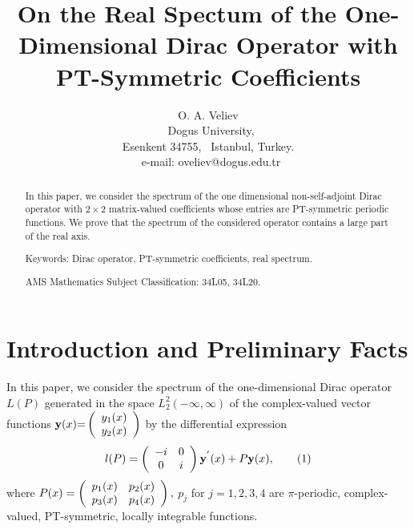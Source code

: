 \documentclass{article}%
\begin{document}
\title{On the Real Spectum of the One-Dimensional Dirac Operator with PT-Symmetric Coefficients}
\author{O. A. Veliev\\{\small \ Dogus University, }\\{\small Esenkent 34755, \ Istanbul, Turkey.}\\\ {\small e-mail: oveliev@dogus.edu.tr}}
\date{}
\maketitle

\begin{abstract}
In this paper, we consider the spectrum of the one dimensional
non-self-adjoint Dirac operator with $2\times2$ matrix-valued coefficients
whose entries are PT-symmetric periodic functions. We prove that the spectrum
of the considered operator contains a large part of the real axis.

Keywords: Dirac operator, PT-symmetric coefficients, real spectrum.

AMS Mathematics Subject Classification: 34L05, 34L20.

\end{abstract}

\section{ Introduction and Preliminary Facts}

In this paper, we consider the spectrum of the one-dimensional Dirac operator
$L(P)$ generated in the space $L_{2}^{2}(-\infty,\infty)$ of the
complex-valued vector functions $\mathbf{y}(x)\mathbf{=}\left(
\begin{array}
[c]{c}%
y_{1}(x)\\
y_{2}(x)
\end{array}
\right)  $ by the differential expression
\begin{equation}
l(P)=\left(
\begin{array}
[c]{cc}%
-i & 0\\
0 & i
\end{array}
\right)  \mathbf{y}^{^{\prime}}(x)+P\mathbf{y}(x), \tag{1}%
\end{equation}
where $P(x)=\left(
\begin{array}
[c]{cc}%
p_{1}(x) & p_{2}(x)\\
p_{3}(x) & p_{4}(x)
\end{array}
\right)  ,$ $p_{j}$ for $j=1,2,3,4$ are $\pi$-periodic, complex-valued,
PT-symmetric, locally integrable functions.
\end{document}
